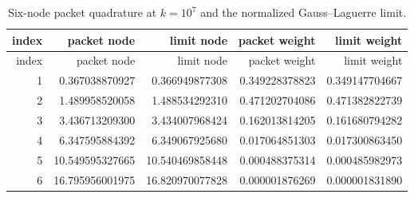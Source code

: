 \begin{longtable}{rrrrr}
\caption{Six-node packet quadrature at $k=10^7$ and the normalized Gauss--Laguerre limit.}\label{tab:quadrature}\\
\toprule
index & packet node & limit node & packet weight & limit weight\\
\midrule
\endfirsthead
\toprule
index & packet node & limit node & packet weight & limit weight\\
\midrule
\endhead
1 & 0.367038870927 & 0.366949877308 & 0.349228378823 & 0.349147704667 \\
2 & 1.489958520058 & 1.488534292310 & 0.471202704086 & 0.471382822739 \\
3 & 3.436713209300 & 3.434007968424 & 0.162013814205 & 0.161680794282 \\
4 & 6.347595884392 & 6.349067925680 & 0.017064851303 & 0.017300863450 \\
5 & 10.549595327665 & 10.540469858448 & 0.000488375314 & 0.000485982973 \\
6 & 16.795956001975 & 16.820970077828 & 0.000001876269 & 0.000001831890 \\
\bottomrule
\end{longtable}

